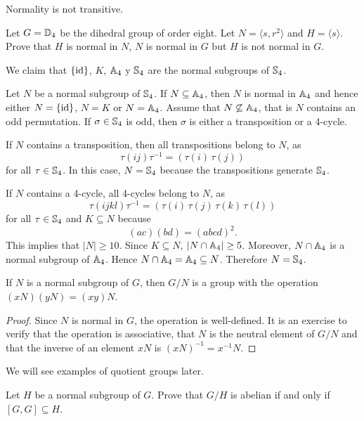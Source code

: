Normality is not transitive. 

\begin{exercise}
Let $G=\mathbb{D}_4$ be the dihedral group of order eight. Let $N=\langle s,r^2\rangle$ and $H=\langle s\rangle$.
Prove that $H$ is normal in $N$, $N$ is normal in $G$ but $H$ is not normal in $G$. 
\end{exercise}

\begin{example}
We claim that $\{\operatorname{id}\}$, $K$, $\mathbb{A}_4$ y $\mathbb{S}_4$ are the normal subgroups of $\mathbb{S}_4$.

Let $N$ be a normal subgroup of $\mathbb{S}_4$. If $N\subseteq\mathbb{A}_4$, then
$N$ is normal in $\mathbb{A}_4$ and hence either $N=\{\operatorname{id}\}$,
$N=K$ or $N=\mathbb{A}_4$. Assume that $N\not\subseteq\mathbb{A}_4$, that is
$N$ contains an odd permutation. If $\sigma\in\mathbb{S}_4$ is odd, then 
$\sigma$ is either a transposition or a 4-cycle. 
 
If $N$ contains a transposition, then all transpositions 
belong to $N$, as 
\[
\tau(ij)\tau^{-1}=(\tau(i)\,\tau(j))
\]
for all $\tau\in\mathbb{S}_4$. In this case, $N=\mathbb{S}_4$ because 
the transpositions generate $\mathbb{S}_4$. 


If $N$ contains a 4-cycle, all 4-cycles belong to $N$, as 
\[
\tau(ijkl)\tau^{-1}=(\tau(i)\,\tau(j)\,\tau(k)\,\tau(l))
\]
for all $\tau\in\mathbb{S}_4$ and $K\subseteq N$ because 
\[
(ac)(bd)=(abcd)^2.
\]
This implies that $|N|\geq10$. Since $K\subseteq N$,  $|N\cap\mathbb{A}_4|\geq 5$. Moreover, $N\cap\mathbb{A}_4$ is a normal subgroup of $\mathbb{A}_4$.
Hence $N\cap\mathbb{A}_4=\mathbb{A}_4\subseteq N$. Therefore $N=\mathbb{S}_4$.
\end{example}

\begin{theorem}
\label{Quotient group}
If $N$ is a normal subgroup of $G$, then
$G/N$ is a group with the operation 
$(xN)(yN)=(xy)N$.
\end{theorem}

\begin{proof}
Since $N$ is normal in $G$, the operation is well-defined. 
It is an exercise to verify that
the operation is associative, that
$N$ is the neutral element of $G/N$ and that 
the inverse of an element $xN$ is 
$(xN)^{-1}=x^{-1}N$. 
\end{proof}

We will see examples of quotient groups later. 

\begin{exercise}
\label{xca:commutator}
Let $H$ be a normal subgroup of $G$. Prove that
$G/H$ is abelian if and only if $[G,G]\subseteq H$.
\end{exercise}

